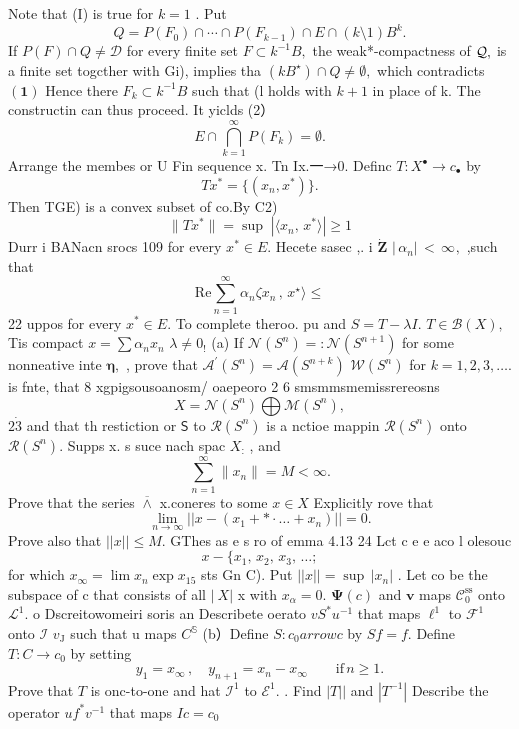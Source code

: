 Note that (I) is true for $\scriptstyle k=1$ . Put $$ Q=P(F_{0})\cap\cdots\cap P(F_{k-1})\cap E\cap(k\setminus1)B^{k}. $$ If $P(F)\cap Q\neq{\mathcal{D}}$ for every finite set $F\subset k^{-1}B,$ the weak*-compactness of ${\cal Q},$ is a finite set togcther with Gi), implies tha $(k B^{\star})\cap Q\neq\emptyset,$ which contradicts $\mathbf{(1)}$ Hence there $F_{k}\subset k^{-1}B$ such that (l holds with $k+1$ in place of k. The constructin can thus proceed. It yiclds (2） $$ E\cap\bigcap_{k=1}^{\infty}P(F_{k})=\emptyset. $$ Arrange the membes or U Fin sequence x. Tn Ix.一→0. Definc $T\colon X^{\bullet}\to c_{\bullet}$ by $$ T x^{*}=\{(x_{n},x^{*})\}. $$ Then TGE) is a convex subset of co.By C2) $$ \|T x^{*}\|=\operatorname*{sup}\;|\langle x_{n},\,x^{*}\rangle|\geq1 $$Durr i BANacn srocs 109 for every $x^{*}\in E.$ Hecete sasec ,. i $\dot{\mathbf{Z}}$ $\left|\,\alpha_{n}\right|\,<\,\infty_{},$ ,such that $$ \mathrm{Re}\sum_{n=1}^{\infty}\alpha_{n}\zeta x_{n}\,,\,x^{\star}\rangle\leq $$ 22 uppos for every $x^{*}\in E.$ To complete theroo. pu and $S=T-\lambda I.$ $T\in{\mathcal{B}}(X),$ Tis compact $x=\sum\alpha_{n}x_{n}$ $\lambda\neq0_{!}$ (a) If ${\mathcal{N}}(S^{n})=:{\mathcal{N}}(S^{n+1})$ for some nonneative inte ${\boldsymbol{\eta}},$ , prove that $\mathcal{A}^{\prime}(S^{n})=\mathcal{A}(S^{n+k})$ ${\mathcal{W}}(S^{n})$ for $k=1,2,3,\dots.$ is fnte, that 8 xgpigsousoanosm/ oaepeoro 2 6 smsmmsmemissrereosns $$ X=\mathcal{N}(S^{n})\bigoplus\mathcal{M}(S^{n}), $$ $2{\dot{3}}$ and that th restiction or $\boldsymbol{\mathsf{S}}$ to ${\mathcal{R}}(S^{n})$ is a nctioe mappin ${\mathcal{R}}(S^{n})$ onto ${\mathcal{R}}(S^{n}).$ Supps x. s suce nach spac $X_{\mathrm{\mathrm{\mathrm{:}}}}$ , and $$ \sum_{n=1}^{\infty}\|x_{n}\|=M<\infty. $$ Prove that the series $\overline{{\land}}$ x.coneres to some $x\in X$ Explicitly rove that $$ \operatorname*{lim}_{n\to\infty}||x-(x_{1}+\ast\cdot\dots+x_{n})||=0. $$ Prove also that $||x||\leq M.$ GThes as e s ro of emma 4.13 24 Lct c e e aco l olesouc $$ x-\{x_{1},\,x_{2},\,x_{3},\,\dots; $$ for which $x_{\infty}=\operatorname*{lim}x_{n}\exp x_{15}$ sts Gn C). Put $||x||=\operatorname*{sup}\,|x_{n}|$ . Let co be the subspace of c that consists of all $\textstyle|\ X|$ x with $x_{\alpha}=0.$ $\mathbf{\Psi}(c)$ and $\boldsymbol{v}$ maps ${\mathcal{C}}_{0}^{\mathrm{ss}}$ onto ${\mathcal{L}}^{1}.$ o Dscreitowomeiri soris an Describete oerato $v S^{*}u^{-1}$ that maps $\ell^{1}$ to ${\mathcal{F}}^{1}$ onto ${\mathcal{I}}$ $v_{\mathrm{{J}}}$ such that u maps $C^{\mathbb{S}}$ (b）Define $S\colon c_{0} arrow c$ by $S f=f.$ Define $T\colon C\to c_{0}$ by setting $$ y_{1}=x_{\infty}\,,\quad y_{n+1}=x_{n}-x_{\infty}\qquad{\mathrm{if}}\,n\geq1. $$ Prove that ${\mathbf{}}T$ is onc-to-one and hat ${\mathcal{I}}^{1}$ to ${\mathcal{E}}^{1}.$ . Find $|T||$ and $|T^{-1}|$ Describe the operator $u f^{*}v^{-1}$ that maps $I c=c_{0}$